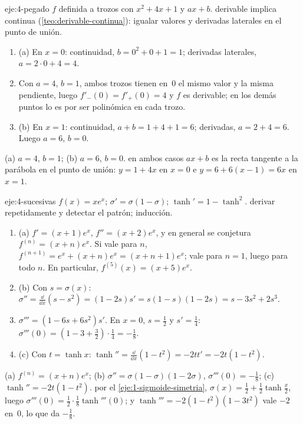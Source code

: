 \begin{solucion}{eje:4-pegado}
\datos $f$ definida a trozos con $x^{2}+4x+1$ y $ax+b$.
\planteamiento derivable implica continua (\cref{teo:derivable-continua}): igualar valores y derivadas laterales en el punto de unión.
\pasos
\begin{enumerate}[label=\arabic*.]
  \item (a) En $x=0$: continuidad, $b=0^{2}+0+1=1$; derivadas laterales, $a=2\cdot0+4=4$.
  \item Con $a=4$, $b=1$, ambos trozos tienen en~0 el mismo valor y la misma pendiente, luego $f'_{-}(0)=f'_{+}(0)=4$ y $f$ es derivable; en los demás puntos lo es por ser polinómica en cada trozo.
  \item (b) En $x=1$: continuidad, $a+b=1+4+1=6$; derivadas, $a=2+4=6$. Luego $a=6$, $b=0$.
\end{enumerate}
\resultado (a) $a=4$, $b=1$; (b) $a=6$, $b=0$.
\comprobacion en ambos casos $ax+b$ es la recta tangente a la parábola en el punto de unión: $y=1+4x$ en $x=0$ e $y=6+6(x-1)=6x$ en $x=1$.
\end{solucion}

\begin{solucion}{eje:4-sucesivas}
\datos $f(x)=xe^{x}$; $\sigma'=\sigma(1-\sigma)$; $\tanh'=1-\tanh^{2}$.
\planteamiento derivar repetidamente y detectar el patrón; inducción.
\pasos
\begin{enumerate}[label=\arabic*.]
  \item (a) $f'=(x+1)e^{x}$, $f''=(x+2)e^{x}$, y en general se conjetura $f^{(n)}=(x+n)e^{x}$. Si vale para $n$, $f^{(n+1)}=e^{x}+(x+n)e^{x}=(x+n+1)e^{x}$; vale para $n=1$, luego para todo $n$. En particular, $f^{(5)}(x)=(x+5)e^{x}$.
  \item (b) Con $s=\sigma(x)$: $\sigma''=\frac{\dd}{\dd x}(s-s^{2})=(1-2s)s'=s(1-s)(1-2s)=s-3s^{2}+2s^{3}$.
  \item $\sigma'''=(1-6s+6s^{2})s'$. En $x=0$, $s=\frac12$ y $s'=\frac14$: $\sigma'''(0)=(1-3+\frac32)\cdot\frac14=-\frac18$.
  \item (c) Con $t=\tanh x$: $\tanh''=\frac{\dd}{\dd x}(1-t^{2})=-2tt'=-2t(1-t^{2})$.
\end{enumerate}
\resultado (a) $f^{(n)}=(x+n)e^{x}$; (b) $\sigma''=\sigma(1-\sigma)(1-2\sigma)$, $\sigma'''(0)=-\frac18$; (c) $\tanh''=-2t(1-t^{2})$.
\comprobacion por el \cref{eje:1-sigmoide-simetria}, $\sigma(x)=\frac12+\frac12\tanh\frac x2$, luego $\sigma'''(0)=\frac12\cdot\frac18\tanh'''(0)$; y $\tanh'''=-2(1-t^{2})(1-3t^{2})$ vale $-2$ en~0, lo que da $-\frac18$.
\end{solucion}

